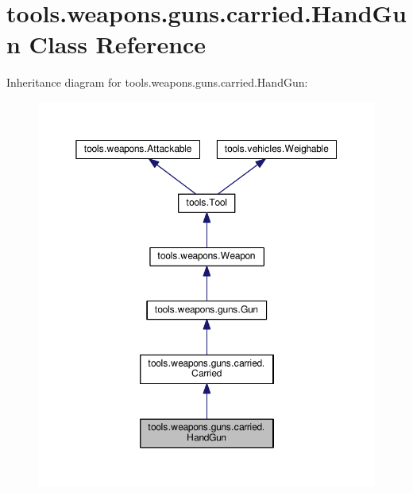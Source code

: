\hypertarget{classtools_1_1weapons_1_1guns_1_1carried_1_1_hand_gun}{}\section{tools.\+weapons.\+guns.\+carried.\+Hand\+Gun Class Reference}
\label{classtools_1_1weapons_1_1guns_1_1carried_1_1_hand_gun}


Inheritance diagram for tools.\+weapons.\+guns.\+carried.\+Hand\+Gun\+:
\nopagebreak
\begin{figure}[H]
\begin{center}
\leavevmode
\includegraphics[width=350pt]{classtools_1_1weapons_1_1guns_1_1carried_1_1_hand_gun__inherit__graph}
\end{center}
\end{figure}


